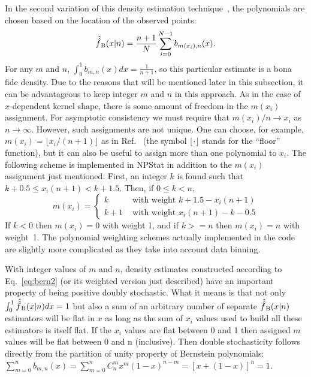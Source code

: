 \documentclass[12pt,titlepage]{article}
\newcommand{\sub}[1]{\ensuremath{_{\mbox{\scriptsize \,#1}}}}
\begin{document}
In the second variation of this density estimation technique~\cite{ref:babu},
the polynomials are chosen
based on the location of the observed points:
\begin{equation}
\hat{\hat{f}}\sub{B}(x|n) = \frac{n + 1}{N} \sum_{i=0}^{N-1} b_{m(x_i), n}(x).
\label{eq:bern2}
\end{equation}
For any $m$ and $n$,
$\int_0^1 b_{m,n}(x) dx = \frac{1}{n + 1}$, so this particular estimate
is a bona fide density. Due to the reasons that will be mentioned later
in this subsection,
it can be advantageous to keep integer $m$ and $n$ in this approach.
As in the case of $x$-dependent kernel shape, there is
some amount of freedom in the $m(x_i)$ assignment. For asymptotic
consistency we must require that $m(x_i)/n \rightarrow x_i$ as 
$n \rightarrow \infty$. However, such
assignments are not unique. One can choose, for example,
$m(x_i) = \lfloor x_i/(n + 1) \rfloor$ as in Ref.~\cite{ref:babu}
(the symbol $\lfloor \cdot \rfloor$ stands for the ``floor''
function), but it can also be useful to assign more than one polynomial
to $x_i$. The following scheme is implemented in NPStat in addition to
the $m(x_i)$ assignment just mentioned. First, an
integer $k$ is found such that $k + 0.5 \leq x_i (n + 1) < k + 1.5$.
Then, if $0 \leq k < n$,
\begin{equation}
m(x_i) = \left\{ \begin{array}{ll}
                   k     & \mbox{ with weight } k + 1.5 - x_i (n + 1) \\
                   k + 1 & \mbox{ with weight }  x_i (n + 1) - k - 0.5
                 \end{array} \right.
\end{equation}
If $k < 0$ then $m(x_i) = 0$ with weight 1, and if $k >= n$ then $m(x_i) = n$
with weight~1.
The polynomial weighting schemes actually implemented in the code are
slightly more complicated as they take into account data binning.

With integer values of $m$ and $n$, density estimates constructed according
to Eq.~\ref{eq:bern2} (or its weighted version just described) have an important
property of being positive doubly stochastic. What it means is that not only
$\int_0^1 \hat{\hat{f}}\sub{B}(x|n) dx = 1$
but also a sum of an arbitrary number of separate $\hat{\hat{f}}\sub{B}(x|n)$
estimators will be flat in $x$
as long as the sum of $x_i$ values used to build all these estimators
is itself flat. If the $x_i$ values are flat
between 0 and 1 then assigned $m$ values will be flat
between 0 and n (inclusive). Then double stochasticity
follows directly from the partition
of unity property of Bernstein polynomials: $\sum_{m=0}^n  b_{m,n}(x) = \sum_{m=0}^n  C_n^m x^m (1 - x)^{n - m} = [x + (1 - x)]^n = 1$.
\end{document}
